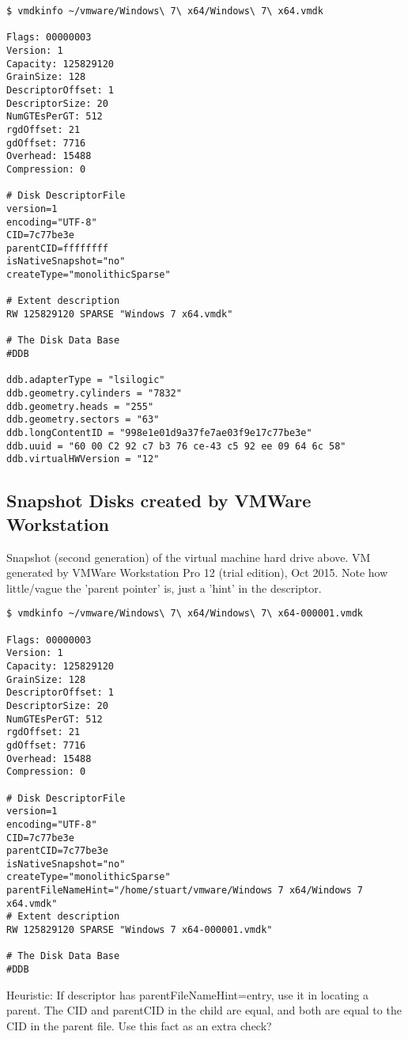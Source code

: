 \documentclass{article}
\begin{document}
\begin{verbatim}
$ vmdkinfo ~/vmware/Windows\ 7\ x64/Windows\ 7\ x64.vmdk 

Flags: 00000003
Version: 1
Capacity: 125829120
GrainSize: 128
DescriptorOffset: 1
DescriptorSize: 20
NumGTEsPerGT: 512
rgdOffset: 21
gdOffset: 7716
Overhead: 15488
Compression: 0

# Disk DescriptorFile
version=1
encoding="UTF-8"
CID=7c77be3e
parentCID=ffffffff
isNativeSnapshot="no"
createType="monolithicSparse"

# Extent description
RW 125829120 SPARSE "Windows 7 x64.vmdk"

# The Disk Data Base 
#DDB

ddb.adapterType = "lsilogic"
ddb.geometry.cylinders = "7832"
ddb.geometry.heads = "255"
ddb.geometry.sectors = "63"
ddb.longContentID = "998e1e01d9a37fe7ae03f9e17c77be3e"
ddb.uuid = "60 00 C2 92 c7 b3 76 ce-43 c5 92 ee 09 64 6c 58"
ddb.virtualHWVersion = "12"
\end{verbatim}

\subsection{Snapshot Disks created by VMWare Workstation}

Snapshot (second generation) of the virtual machine hard drive
above. VM generated by VMWare Workstation Pro 12 (trial edition), Oct
2015.  Note how little/vague the 'parent pointer' is, just a 'hint' in
the descriptor.
  
\begin{verbatim}
$ vmdkinfo ~/vmware/Windows\ 7\ x64/Windows\ 7\ x64-000001.vmdk 

Flags: 00000003
Version: 1
Capacity: 125829120
GrainSize: 128
DescriptorOffset: 1
DescriptorSize: 20
NumGTEsPerGT: 512
rgdOffset: 21
gdOffset: 7716
Overhead: 15488
Compression: 0

# Disk DescriptorFile
version=1
encoding="UTF-8"
CID=7c77be3e
parentCID=7c77be3e
isNativeSnapshot="no"
createType="monolithicSparse"
parentFileNameHint="/home/stuart/vmware/Windows 7 x64/Windows 7 x64.vmdk"
# Extent description
RW 125829120 SPARSE "Windows 7 x64-000001.vmdk"

# The Disk Data Base 
#DDB
\end{verbatim}

Heuristic: If descriptor has parentFileNameHint=entry, use it in locating
a parent.  The CID and parentCID in the child are equal, and both are
equal to the CID in the parent file.  Use this fact as an extra check?
\end{document}
